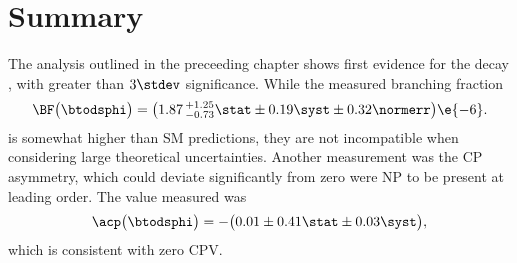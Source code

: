 \section{Summary}
\label{sec:dsphi:conc}

The analysis outlined in the preceeding chapter shows first evidence for the decay \btodsphi, with
greater than $3\stdev$ significance.
While the measured branching fraction
\begin{equation}
  \BF\big(\btodsphi\big) =
  \big(1.87\,^{+1.25}_{-0.73}\stat\pm0.19\syst\pm0.32\normerr\big)\e{-6}.
  \label{eq:dsphi:result}
\end{equation}
is somewhat higher than SM predictions, they are not incompatible when considering large
theoretical uncertainties.
Another measurement was the CP asymmetry, which could deviate significantly from zero were NP to be
present at leading order.
The value measured was
\begin{equation}
  \acp\big(\btodsphi\big)=
  -\big(0.01\pm0.41\stat\pm0.03\syst\big),
\end{equation}
which is consistent with zero CPV.
